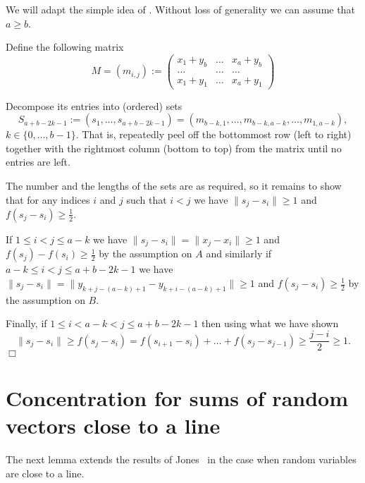 \documentclass{article}
\newenvironment{proof}{\noindent{\bf Proof}}{\hspace*{\fill}$\Box$}
\begin{document}
\begin{proof}
We will adapt the simple idea of \cite{btk}. Without loss of generality we can assume that $a \ge b$. 

Define the following matrix
    \[ M = (m_{i,j}) := 
\begin{pmatrix}
x_1 + y_b & \dots & x_a + y_b\\
\dots & \dots & \dots \\
x_1 + y_1 & \dots & x_a + y_1
\end{pmatrix}
\]

Decompose its entries into (ordered) sets
\[
S_{a + b - 2k - 1} := (s_1, \dots, s_{a+b-2k-1}) =  (m_{b - k, 1}, \dots, m_{b-k, a-k}, \dots, m_{1, a-k}),
\]
$k \in \{0, \dots, b - 1\}$. That is, repeatedly peel off the bottommost row (left to right) together with the rightmost column (bottom to top) from the matrix until no entries are left.

The number and the lengths of the sets are as required, so it remains to show that for any indices $i$ and $j$ such that $i < j$ we have $\|s_j - s_i\| \ge 1$ and $f(s_j - s_i) \ge \frac 1 2$.

If $1 \le i < j \le a - k$ we have $\|s_j - s_i\| = \|x_j - x_i\| \ge 1$ and $f(s_j) - f(s_i) \ge \frac 1 2$ by the assumption on $A$ and similarly if $a - k \le i < j \le a+b-2k-1$ we have $\|s_j - s_i\| = \| y_{k + j - (a-k)+1} - y_{k+ i - (a-k)+1}\| \ge 1$ and $f(s_j - s_i) \ge \frac 1 2$ by the assumption on $B$.



Finally, if $1 \le i < a-k < j \le a+b-2k-1$ then using what we have shown
\[
    \|s_j - s_i\| \ge f(s_j - s_i) = f(s_{i+1} - s_i) + \dots + f(s_j - s_{j-1}) \ge \frac {j - i} 2 \ge 1.
\]
\end{proof}


\section{Concentration for sums of random vectors close to a line}
\label{sec.nice_proofs}

The next lemma extends the results of Jones~\cite{jones} in the case when random variables
are close to a line.
\end{document}
